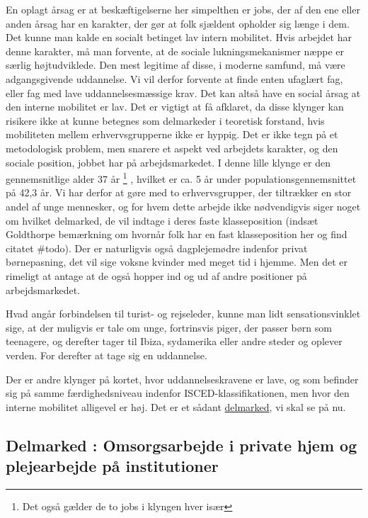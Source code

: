 En oplagt årsag er at beskæftigelserne her simpelthen er jobs, der af den ene eller anden årsag har en karakter, der gør at folk sjældent opholder sig længe i dem. Det kunne man kalde en socialt betinget lav intern mobilitet. Hvis arbejdet har denne karakter, må man forvente, at de sociale lukningsmekanismer næppe er særlig højtudviklede. Den mest legitime af disse, i moderne samfund, må være adgangsgivende uddannelse. Vi vil derfor forvente at finde enten ufaglært fag, eller fag med lave uddannelsesmæssige krav. Det kan altså have en social årsag at den interne mobilitet er lav. Det er vigtigt at få afklaret, da disse klynger kan risikere ikke at kunne betegnes som delmarkeder i teoretisk forstand, hvis mobiliteten mellem erhvervsgrupperne ikke er hyppig. Det er ikke tegn på et metodologisk problem, men snarere et aspekt ved arbejdets karakter, og den sociale position, jobbet har på arbejdsmarkedet. I denne lille klynge er den gennemsnitlige alder 37 år%
%
\footnote{ Det også gælder de to jobs i klyngen hver især}%
%
, hvilket er ca. 5 år under populationsgennemsnittet på 42,3 år. Vi har derfor at gøre med to erhvervsgrupper, der tiltrækker en stor andel af unge mennesker, og for hvem dette arbejde ikke nødvendigvis siger noget om hvilket delmarked, de vil indtage i deres faste klasseposition (indsæt Goldthorpe bemærkning om hvornår folk har en fast klasseposition her og find citatet \#todo). Der er naturligvis også dagplejemødre indenfor privat børnepasning, det vil sige voksne kvinder med meget tid i hjemme. Men det er rimeligt at antage at de også hopper ind og ud af andre positioner på arbejdsmarkedet. 

Hvad angår forbindelsen til turist- og rejseleder, kunne man lidt sensationsvinklet sige, at der muligvis er tale om unge, fortrinsvis piger, der passer børn som teenagere, og derefter tager til Ibiza, sydamerika eller andre steder og oplever verden. For derefter at tage sig en uddannelse.

Der er andre klynger på kortet, hvor uddannelseskravene er lave, og som befinder sig på samme færdighedsniveau indenfor ISCED-klassifikationen, men hvor den interne mobilitet alligevel er høj. Det er et sådant \underline{delmarked}, vi skal se på nu.


\subsection{Delmarked : Omsorgsarbejde i private hjem og plejearbejde på institutioner}

